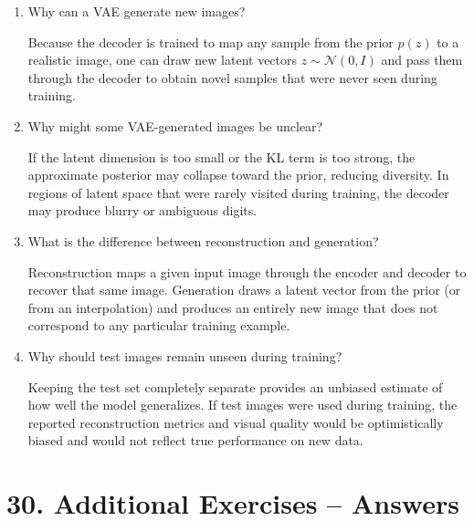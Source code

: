 \documentclass[10pt]{article}
\begin{document}
\begin{enumerate}
Linear interpolation between two latent vectors
\[
z(\alpha) = (1-\alpha)z_A + \alpha z_B, \quad \alpha\in[0,1]
\]
and decoding the intermediate points shows whether the latent space is smooth. Gradual changes in the decoded images indicate that the model has learned a continuous manifold.\\

\item Why can a VAE generate new images?

Because the decoder is trained to map any sample from the prior \(p(z)\) to a realistic image, one can draw new latent vectors \(z\sim\mathcal{N}(0,I)\) and pass them through the decoder to obtain novel samples that were never seen during training.\\

\item Why might some VAE-generated images be unclear?

If the latent dimension is too small or the KL term is too strong, the approximate posterior may collapse toward the prior, reducing diversity. In regions of latent space that were rarely visited during training, the decoder may produce blurry or ambiguous digits.\\

\item What is the difference between reconstruction and generation?

Reconstruction maps a given input image through the encoder and decoder to recover that same image. Generation draws a latent vector from the prior (or from an interpolation) and produces an entirely new image that does not correspond to any particular training example.\\

\item Why should test images remain unseen during training?

Keeping the test set completely separate provides an unbiased estimate of how well the model generalizes. If test images were used during training, the reported reconstruction metrics and visual quality would be optimistically biased and would not reflect true performance on new data.\\

\end{enumerate}

\section*{30. Additional Exercises -- Answers}
\end{document}
